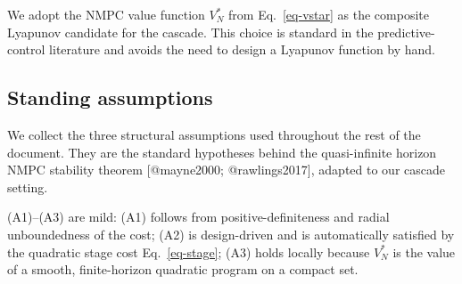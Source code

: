 \documentclass[
  11pt,
]{article}
\theoremstyle{plain}
\theoremstyle{plain}
\theoremstyle{definition}
\theoremstyle{remark}
\begin{document}
We adopt the NMPC value function \(V_N^*\) from Eq.~\ref{eq-vstar} as
the composite Lyapunov candidate for the cascade. This choice is
standard in the predictive-control literature and avoids the need to
design a Lyapunov function by hand.

\subsection{Standing assumptions}\label{standing-assumptions}

We collect the three structural assumptions used throughout the rest of
the document. They are the standard hypotheses behind the quasi-infinite
horizon NMPC stability theorem {[}@mayne2000; @rawlings2017{]}, adapted
to our cascade setting.

\begin{assumption}


\caption{\label{asm-lyap}}

\end{assumption}%

(A1)--(A3) are mild: (A1) follows from positive-definiteness and radial
unboundedness of the cost; (A2) is design-driven and is automatically
satisfied by the quadratic stage cost Eq.~\ref{eq-stage}; (A3) holds
locally because \(V_N^*\) is the value of a smooth, finite-horizon
quadratic program on a compact set.
\end{document}
